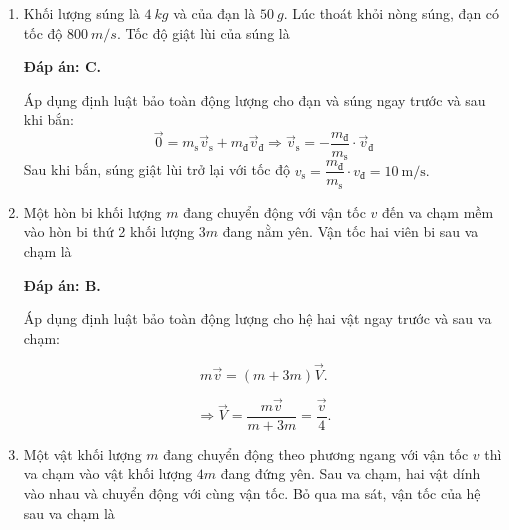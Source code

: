 \begin{enumerate}[label=\bfseries Câu \arabic*:, leftmargin=1.5cm]
{	}
	\item {}
	
	
	{Khối lượng súng là $\SI{4}{kg}$ và của đạn là $\SI{50}{g}$. Lúc thoát khỏi nòng súng, đạn có tốc độ $\SI{800}{m/s}$. Tốc độ giật lùi của súng là
	}
	
	\hideall
	{	\textbf{Đáp án: C.}
		
	Áp dụng định luật bảo toàn động lượng cho đạn và súng ngay trước và sau khi bắn:
	$$\vec 0=m_\text{s}\vec v_\text{s}+m_\text{đ}\vec v_\text{đ}\Rightarrow \vec v_\text{s}=-\dfrac{m_\text{đ}}{m_\text{s}}\cdot\vec v_\text{đ}$$
	Sau khi bắn, súng giật lùi trở lại với tốc độ $v_\text{s}=\dfrac{m_\text{đ}}{m_\text{s}}\cdot v_\text{đ}=\SI{10}{\meter/\second}.$
	}

	\item {}
	
	
	{Một hòn bi khối lượng $m$ đang chuyển động với vận tốc $v$ đến va chạm mềm vào hòn bi thứ 2 khối lượng $3m$ đang nằm yên. Vận tốc hai viên bi sau va chạm là
	}
	
	\hideall
	{	
		\textbf{Đáp án: B.}
		
		Áp dụng định luật bảo toàn động lượng cho hệ hai vật ngay trước và sau va chạm:
		
		$$m\vec v = (m+ 3m)\vec V.$$
		
		$$ \Rightarrow \vec V = \dfrac{m\vec v}{m + 3m} = \dfrac{\vec v}{4}.$$
	}
	\item {}
	
	
	{Một vật khối lượng $m$ đang chuyển động theo phương ngang với vận tốc $v$ thì va chạm vào vật khối lượng $4m$ đang đứng yên. Sau va chạm, hai vật dính vào nhau và chuyển động với cùng vận tốc. Bỏ qua ma sát, vận tốc của hệ sau va chạm là 
	}
	

\end{enumerate}
